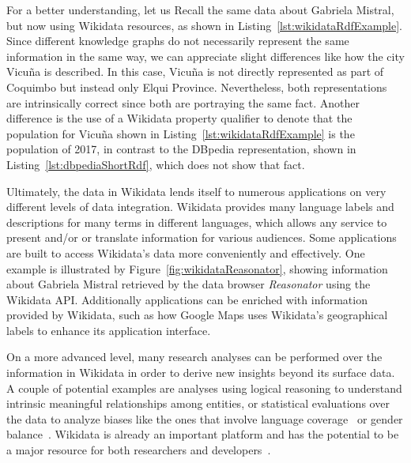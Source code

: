 
For a better understanding, let us Recall the same data about Gabriela Mistral, but now using 
Wikidata resources, as shown in Listing~\ref{lst:wikidataRdfExample}. Since different knowledge 
graphs do not necessarily represent the same information in the same way, we can appreciate slight 
differences like how the city Vicuña is described. In this case, Vicuña is not directly represented 
as part of Coquimbo but instead only Elqui Province. Nevertheless, both representations are 
intrinsically correct since both are portraying the same fact. Another difference is the use of 
a Wikidata property qualifier to denote that the population for Vicuña shown in 
Listing~\ref{lst:wikidataRdfExample} is the population of 2017, in contrast to the DBpedia 
representation, shown in Listing~\ref{lst:dbpediaShortRdf}, which does not show that fact.

Ultimately, the data in Wikidata lends itself to numerous applications on very different levels 
of data integration. Wikidata provides many language labels and descriptions for many terms in 
different languages, which allows any service to present and/or or translate information for 
various audiences. Some applications are built to access Wikidata’s data more conveniently and 
effectively. One example is illustrated by Figure~\ref{fig:wikidataReasonator}, showing 
information about Gabriela Mistral retrieved by the data browser 
\textit{Reasonator} using the Wikidata API. Additionally 
applications can be enriched with information provided by Wikidata, such as how Google Maps 
uses Wikidata’s geographical labels to enhance its application interface. 

On a more advanced level, many research analyses can be performed over the information in 
Wikidata in order to derive new insights beyond its surface data. A couple of potential examples 
are analyses using logical reasoning to understand intrinsic meaningful relationships among 
entities, or statistical evaluations over the data to analyze biases like the ones that involve 
language coverage~\cite{key:wikidataHale13} or gender balance~\cite{key:socialWikidataWagner16}. 
Wikidata is already an important platform and has the potential to be a major resource for both 
researchers and developers~\cite{wikidata:GeneWikiInitiative, wikidata:RiseWikidataVrandecic6682924}.
